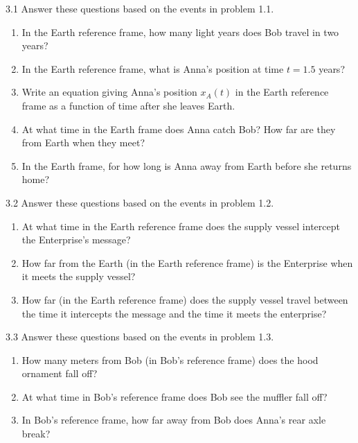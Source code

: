 3.1 Answer these questions based on the events in problem 1.1.
\begin{enumerate}[nosep,label=(\emph{\alph*})]
\item In the Earth reference frame, how many light years does Bob travel in two years?
\answerspace{0.3in}

\item In the Earth reference frame, what is Anna's position at time $t=1.5$ years?
\answerspace{0.3in}

\item Write an equation giving Anna's position $x_A(t)$ in the Earth reference frame as a function of time after she leaves Earth.
\answerspace{0.3in}

\item At what time in the Earth frame does Anna catch Bob?  How far are they from Earth when they meet?
\answerspace{0.3in}

\item In the Earth frame, for how long is Anna away from Earth before she returns home?
\answerspace{0.3in}

\end{enumerate}

3.2 Answer these questions based on the events in problem 1.2.
\begin{enumerate}[nosep,label=(\emph{\alph*})]
\item At what time in the Earth reference frame does the supply vessel intercept the Enterprise's message?
\answerspace{0.3in}

\item How far from the Earth (in the Earth reference frame) is the Enterprise when it meets the supply vessel?
\answerspace{0.3in}

\item How far (in the Earth reference frame) does the supply vessel travel between the time it intercepts the message and the time it meets the enterprise?
\answerspace{0.3in}

\end{enumerate}

3.3 Answer these questions based on the events in problem 1.3.
\begin{enumerate}[nosep,label=(\emph{\alph*})]
\item How many meters from Bob (in Bob's reference frame) does the hood ornament fall off?
\answerspace{0.3in}

\item At what time in Bob's reference frame does Bob see the muffler fall off?
\answerspace{0.3in}

\item In Bob's reference frame, how far away from Bob does Anna's rear axle break?
\answerspace{0.3in}
  
\end{enumerate}

